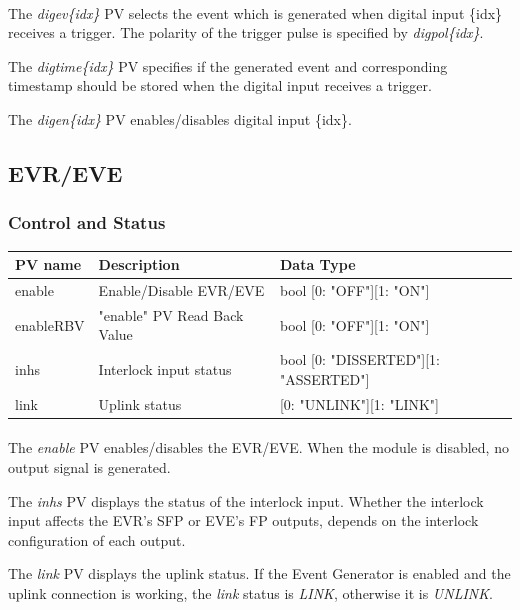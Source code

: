 \documentclass[openany]{article}
\begin{document}
			\paragraph{} The \emph{digev\{idx\}} PV selects the event which is generated when digital input \{idx\} receives a trigger. The polarity of the trigger pulse is specified by \emph{digpol\{idx\}}.
			\par The \emph{digtime\{idx\}} PV specifies if the generated event and corresponding timestamp should be stored when the digital input receives a trigger.
			\par The \emph{digen\{idx\}} PV enables/disables digital input \{idx\}.

	\subsection{EVR/EVE}

	\etoclocalframed[1]{}

		\subsubsection{Control and Status}\label{pvgroup:evre-control-status}
			\begin{center}
			\begin{tabular}{| m{2.8cm} m{6cm} m{6cm} |}
			    \hline
			    \bfseries PV name & \bfseries Description & \bfseries Data Type \\ \hline
			    enable & Enable/Disable EVR/EVE & bool [0: "OFF"][1: "ON"] \\ \hline
			    enableRBV & "enable" PV Read Back Value & bool [0: "OFF"][1: "ON"] \\ \hline
			    inhs & Interlock input status & bool [0: "DISSERTED"][1: "ASSERTED"] \\ \hline
			    link & Uplink status & [0: "UNLINK"][1: "LINK"] \\ \hline
			\end{tabular}
			\end{center}

			\paragraph{} The \emph{enable} PV enables/disables the EVR/EVE. When the module is disabled, no output signal is generated.
			\par The \emph{inhs} PV displays the status of the interlock input. Whether the interlock input affects the EVR's SFP or EVE's FP outputs, depends on the interlock configuration of each output.
			\par The \emph{link} PV displays the uplink status. If the Event Generator is enabled and the uplink connection is working, the \emph{link} status is \emph{LINK}, otherwise it is \emph{UNLINK}.
\end{document}
